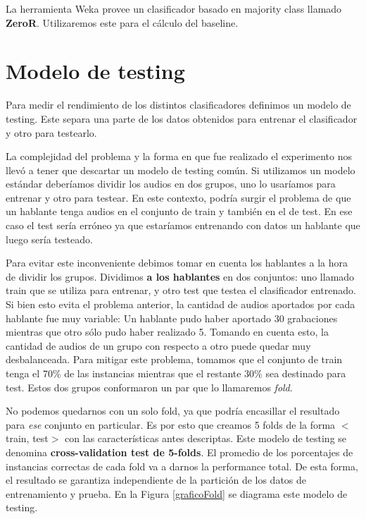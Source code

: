 La herramienta Weka provee un clasificador basado en majority class llamado \textbf{ZeroR}. Utilizaremos este para el cálculo del baseline. 

\section{Modelo de testing}

Para medir el rendimiento de los distintos clasificadores definimos un modelo de testing. Este separa una parte de los datos obtenidos para entrenar el clasificador y otro para testearlo.

La complejidad del problema y la forma en que fue realizado el experimento nos llevó a tener que descartar un modelo de testing común. Si utilizamos un modelo estándar deberíamos dividir los audios en dos grupos, uno lo usaríamos para entrenar y otro para testear. En este contexto, podría surgir el problema de que un hablante tenga audios en el conjunto de train y también en el de test. En ese caso el test sería erróneo ya que estaríamos entrenando con datos un hablante que luego sería testeado.

Para evitar este inconveniente debimos tomar en cuenta los hablantes a la hora de dividir los grupos. Dividimos \textbf{a los hablantes} en dos conjuntos: uno llamado train que se utiliza para entrenar, y otro test que testea el clasificador entrenado. Si bien esto evita el problema anterior, la cantidad de audios aportados por cada hablante fue muy variable: Un hablante pudo haber aportado 30 grabaciones mientras que otro sólo pudo haber realizado 5. Tomando en cuenta esto, la cantidad de audios de un grupo con respecto a otro puede quedar muy desbalanceada. Para mitigar este problema, tomamos que el conjunto de train tenga el 70\% de las instancias mientras que el restante 30\% sea destinado para test. Estos dos grupos conformaron un par que lo llamaremos \textit{fold}.

No podemos quedarnos con un solo fold, ya que podría encasillar el resultado para \textit{ese} conjunto en particular. Es por esto que creamos 5 folds de la forma $<$train, test$>$ con las características antes descriptas. Este modelo de testing se denomina \textbf{cross-validation test de 5-folds}. El promedio de los porcentajes de instancias correctas de cada fold va a darnos la performance total. De esta forma, el resultado se garantiza independiente de la partición de los datos de entrenamiento y prueba. En la Figura \ref{graficoFold} se diagrama este modelo de testing.

